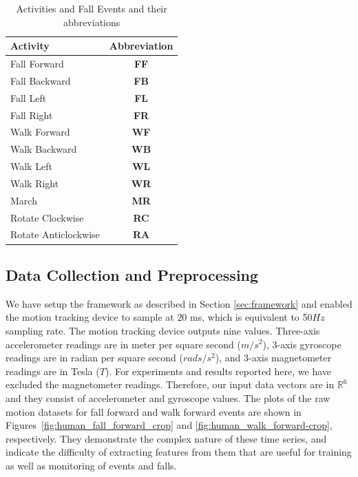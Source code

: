 \documentclass[]{IEEEtran}
\begin{document}
\begin{table}[htb]
\caption{Activities and Fall Events and their abbreviations}
\centering
{
\begin{tabular}{|l|c|}
\hline
\textbf{Activity} & \textbf{Abbreviation} \\  \hline
Fall Forward &\textbf{FF} \\ \hline
Fall Backward &\textbf{FB}  \\ \hline
Fall Left &\textbf{FL}  \\ \hline
Fall Right &\textbf{FR}  \\ \hline \hline
Walk Forward &\textbf{WF} \\ \hline
Walk Backward &\textbf{WB} \\ \hline
Walk Left &\textbf{WL} \\ \hline
Walk Right &\textbf{WR}  \\ \hline
March &\textbf{MR}  \\ \hline
Rotate Clockwise &\textbf{RC} \\ \hline
Rotate Anticlockwise&\textbf{RA}  \\ \hline
\end{tabular}
}
\label{Tbl:ListOfActivities}
\end{table}

\subsection{Data Collection and Preprocessing  }
\label{subsec:preDataCollection}

We have setup the framework as described in Section \ref{sec:framework} and enabled the 
motion tracking device to sample at $20$ ms, which is equivalent to 50$Hz$ 
sampling rate. The motion tracking device outputs nine values. Three-axis  
accelerometer readings are in  meter per square second ($m/s^2$), 3-axis gyroscope readings are 
in radian per square second ($rads/s^2$), and  3-axis magnetometer readings are  in 
Tesla ($T$). For experiments  and results reported here, we have excluded the magnetometer readings. Therefore, 
our input data vectors  are in $\mathbb{R}^6$ and they consist of accelerometer and 
gyroscope values. The plots of the raw motion datasets for fall forward and  walk forward 
events 
are shown in Figures~\ref{fig:human_fall_forward_crop} and 
\ref{fig:human_walk_forward-crop}, respectively. They demonstrate the complex nature of 
these time series, and indicate the difficulty of extracting features from them that are 
useful for training as well as monitoring of events and falls.
\end{document}
